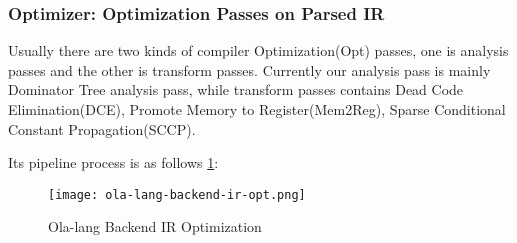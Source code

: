 \subsubsection{Optimizer: Optimization Passes on Parsed IR}

Usually there are two kinds of compiler Optimization(Opt) passes, one is analysis passes and the other is transform passes.
Currently our analysis pass is mainly Dominator Tree analysis pass,
while transform passes contains Dead Code Elimination(DCE), Promote Memory to Register(Mem2Reg), Sparse Conditional Constant Propagation(SCCP).

Its pipeline process is as follows \ref{fig:ola-lang-backend-ir-opt}:
\begin{figure}[!htbp]
    \centering
    \texttt{[image: ola-lang-backend-ir-opt.png]}
    \caption{Ola-lang Backend IR Optimization}
    \label{fig:ola-lang-backend-ir-opt}
\end{figure}
